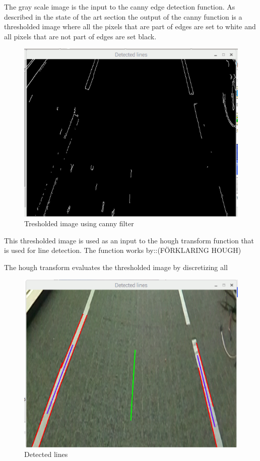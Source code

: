 The gray scale image is the input to the canny edge detection function. As described in the state of the art section the output of the canny function is a thresholded image where all the pixels that are part of edges are set to white and all pixels that are not part of edges are set black.

\begin{figure}[H]
  \includegraphics[scale=0.7]{./img/edges.png}
  \centering
  \caption{Tresholded image using canny filter}
  \label{fig:Tresholded image using canny filter}
\end{figure}

This thresholded image is used as an input to the hough transform function that is used for line detection. The function works by::(FÖRKLARING HOUGH)


The hough transform evaluates the thresholded image by discretizing all


\begin{figure}[H]
  \includegraphics[scale=0.7]{./img/detected_lines.png}
  \centering
  \caption{Detected lines}
  \label{fig:Detected lines}
\end{figure}


